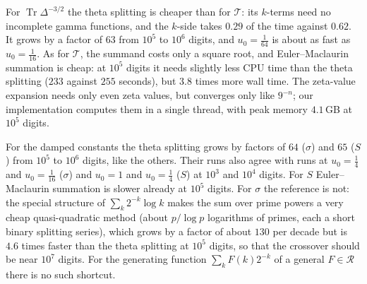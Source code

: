 \documentclass[11pt,reqno]{amsart}
\theoremstyle{definition}
\theoremstyle{remark}
\newcommand{\Reg}{\mathcal{R}}
\begin{document}
For $\operatorname{Tr}\Delta^{-3/2}$ the theta splitting is cheaper than for $\mathcal T$: its $k$-terms need no
incomplete gamma functions, and the $k$-side takes $0.29$ of the time against $0.62$. It grows by a factor of $63$ from
$10^5$ to $10^6$ digits, and $u_0 = \frac1{64}$ is about as fast as $u_0 = \frac1{16}$. As for $\mathcal T$, the summand
costs only a square root, and Euler--Maclaurin summation is cheap: at $10^5$ digits it needs slightly less CPU time than the
theta splitting ($233$ against $255$ seconds), but $3.8$ times more wall time. The zeta-value expansion needs only even
zeta values, but converges only like $9^{-n}$; our implementation computes them in a single thread, with peak memory
$4.1$\,GB at $10^5$ digits.

For the damped constants the theta splitting grows by factors of $64$ ($\sigma$) and $65$ ($S$) from $10^5$ to $10^6$
digits, like the others. Their runs also agree with runs at $u_0 = \frac14$ and $u_0 = \frac1{16}$ ($\sigma$) and
$u_0 = 1$ and $u_0 = \frac14$ ($S$) at $10^3$ and $10^4$ digits. For $S$ Euler--Maclaurin summation is slower already
at $10^5$ digits. For $\sigma$ the reference is not: the special structure of $\sum_k2^{-k}\log k$ makes the sum over
prime powers a very cheap quasi-quadratic method (about $p/\log p$ logarithms of primes, each a short binary splitting
series), which grows by a factor of about $130$ per decade but is $4.6$ times faster than the theta splitting at
$10^5$ digits, so that the crossover should be near $10^7$ digits. For the generating function $\sum_kF(k)2^{-k}$ of a
general $F \in \Reg$ there is no such shortcut.
\end{document}
